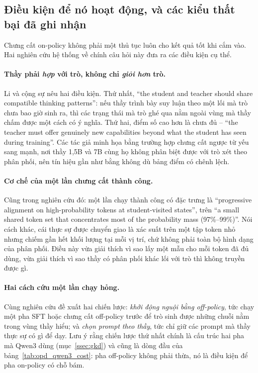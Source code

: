 \subsection{Điều kiện để nó hoạt động, và các kiểu thất bại đã ghi nhận}
\label{ssec:opd_conditions}

Chưng cất on-policy không phải một thủ tục luôn cho kết quả tốt khi cắm vào. Hai nghiên cứu hệ thống về chính câu hỏi này đưa ra các điều kiện cụ thể.

\paragraph{Thầy phải \emph{hợp} với trò, không chỉ \emph{giỏi hơn} trò.} Li và cộng sự \cite{li2026rethinkingopd} nêu hai điều kiện. Thứ nhất, ``the student and teacher should share compatible thinking patterns'': nếu thầy trình bày suy luận theo một lối mà trò chưa bao giờ sinh ra, thì các trạng thái mà trò ghé qua nằm ngoài vùng mà thầy chấm được một cách có ý nghĩa. Thứ hai, điểm số cao hơn là chưa đủ -- ``the teacher must offer genuinely new capabilities beyond what the student has seen during training''. Các tác giả minh họa bằng trường hợp chưng cất ngược từ yếu sang mạnh, nơi thầy 1,5B và 7B cùng họ không phân biệt được với trò xét theo phân phối, nên tín hiệu gần như bằng không dù bảng điểm có chênh lệch.

\paragraph{Cơ chế của một lần chưng cất thành công.} Cũng trong nghiên cứu đó: một lần chạy thành công có đặc trưng là ``progressive alignment on high-probability tokens at student-visited states'', trên ``a small shared token set that concentrates most of the probability mass (97\%--99\%)''. Nói cách khác, cái thực sự được chuyển giao là xác suất trên một tập token nhỏ nhưng chiếm gần hết khối lượng tại mỗi vị trí, chứ không phải toàn bộ hình dạng của phân phối. Điều này vừa giải thích vì sao lấy một mẫu cho mỗi token đã đủ dùng, vừa giải thích vì sao thầy có phân phối khác lối với trò thì không truyền được gì.

\paragraph{Hai cách cứu một lần chạy hỏng.} Cùng nghiên cứu đề xuất hai chiến lược: \emph{khởi động nguội bằng off-policy}, tức chạy một pha SFT hoặc chưng cất off-policy trước để trò sinh được những chuỗi nằm trong vùng thầy hiểu; và \emph{chọn prompt theo thầy}, tức chỉ giữ các prompt mà thầy thực sự có gì để dạy. Lưu ý rằng chiến lược thứ nhất chính là cấu trúc hai pha mà Qwen3 dùng (mục~\ref{ssec:gkd}) và cũng là dòng đầu của bảng~\ref{tab:opd_qwen3_cost}: pha off-policy không phải thừa, nó là điều kiện để pha on-policy có chỗ bám.

